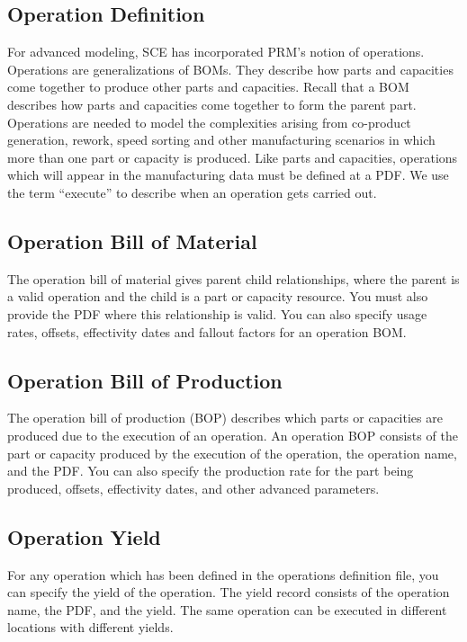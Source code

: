 \subsection{Operation Definition}
For advanced modeling, SCE has incorporated PRM's notion of
operations.  Operations are generalizations of BOMs.  They describe
how parts and capacities come together to produce other parts and
capacities.  Recall that a BOM describes how parts and capacities come
together to form the parent part.  Operations are needed to model the
complexities arising from co-product generation, rework, speed sorting
and other manufacturing scenarios in which more than one part or
capacity is produced.  Like parts and capacities, operations which
will appear in the manufacturing data must be defined at a PDF.  We
use the term ``execute'' to describe when an operation gets
carried out.

\subsection{Operation Bill of Material}
The operation bill of material gives parent child relationships, where
the parent is a valid operation and the child is a part or capacity
resource.  You must also provide the PDF where this relationship is
valid.  You can also specify usage rates, offsets, effectivity dates
and fallout factors for an operation BOM.

\subsection{Operation Bill of Production}
The operation bill of production (BOP) describes which parts or
capacities are produced due to the execution of an operation.  An
operation BOP consists of the part or capacity produced by the
execution of the operation, the operation name, and the PDF.  You can
also specify the production rate for the part being produced, offsets,
effectivity dates, and other advanced parameters.
 
\subsection{Operation Yield}
For any operation which has been defined in the operations definition
file, you can specify the yield of the operation.  The yield record
consists of the operation name, the PDF, and the yield.  The same
operation can be executed in different locations with different
yields.

